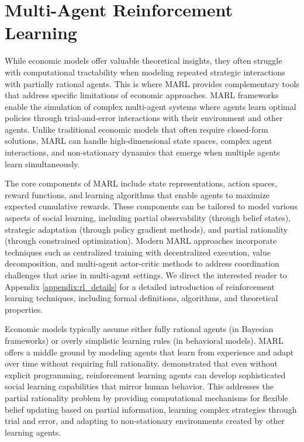 \documentclass[a4paper,12pt]{report}
\begin{document}
\section{Multi-Agent Reinforcement Learning}

While economic models offer valuable theoretical insights, they often struggle with computational tractability when modeling repeated strategic interactions with partially rational agents. This is where MARL provides complementary tools that address specific limitations of economic approaches. MARL frameworks enable the simulation of complex multi-agent systems where agents learn optimal policies through trial-and-error interactions with their environment and other agents. Unlike traditional economic models that often require closed-form solutions, MARL can handle high-dimensional state spaces, complex agent interactions, and non-stationary dynamics that emerge when multiple agents learn simultaneously.

The core components of MARL include state representations, action spaces, reward functions, and learning algorithms that enable agents to maximize expected cumulative rewards. These components can be tailored to model various aspects of social learning, including partial observability (through belief states), strategic adaptation (through policy gradient methods), and partial rationality (through constrained optimization). Modern MARL approaches incorporate techniques such as centralized training with decentralized execution, value decomposition, and multi-agent actor-critic methods to address coordination challenges that arise in multi-agent settings. We direct the interested reader to Appendix \ref{appendix:rl_details} for a detailed introduction of reinforcement learning techniques, including formal definitions, algorithms, and theoretical properties.

Economic models typically assume either fully rational agents (in Bayesian frameworks) or overly simplistic learning rules (in behavioral models). MARL offers a middle ground by modeling agents that learn from experience and adapt over time without requiring full rationality. \citet{ndousse2021emergent} demonstrated that even without explicit programming, reinforcement learning agents can develop sophisticated social learning capabilities that mirror human behavior. This addresses the partial rationality problem by providing computational mechanisms for flexible belief updating based on partial information, learning complex strategies through trial and error, and adapting to non-stationary environments created by other learning agents.
\end{document}
